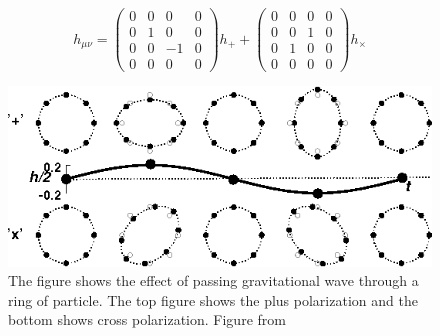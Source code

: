 \documentclass{ttuthes2007}
\begin{document}
\begin{equation*}                                                               
h_{\mu\nu}=     
 \begin{pmatrix}                                                                
    0 & 0 & 0 & 0 \\                                                            
    0 & 1 & 0 & 0 \\                                                            
    0 & 0 & -1 & 0 \\                                                            
    0 & 0 & 0 & 0                                                               
 \end{pmatrix}
h_+  
+
 \begin{pmatrix}                                                                
    0 & 0 & 0 & 0 \\                                                            
    0 & 0 & 1 & 0 \\                                                            
    0 & 1 & 0 & 0 \\                                                            
    0 & 0 & 0 & 0                                                               
 \end{pmatrix}
h_\times                                                                  
\end{equation*} 

\begin{figure}[h!]                                                              
	\includegraphics[width=\textwidth]{figure/polarization.png}
	\caption{The figure shows the effect of passing gravitational wave
through a ring of particle. The top figure shows the plus polarization and the
bottom shows cross polarization. Figure from ~\citet{Schutz}}                                                     
        \label{fig:polarization}
\end{figure}
\end{document}

